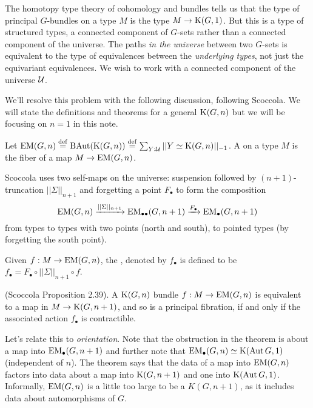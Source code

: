 The homotopy type theory of cohomology and bundles tells us that the type of principal \( G \)-bundles on a type \( M \) is the type \( M\to\mathrm{K}(G,1) \). But this is a type of structured types, a connected component of \( G \)-sets rather than a connected component of the universe. The paths \emph{in the universe} between two \( G \)-sets is equivalent to the type of equivalences between the \emph{underlying types}, not just the equivariant equivalences. We wish to work with a connected component of the universe \( \mathcal{U} \).

We'll resolve this problem with the following discussion, following Scoccola\cite{sco}. We will state the definitions and theorems for a general \( \mathrm{K}(G,n) \) but we will be focusing on \( n=1 \) in this note.

\begin{mydef}
Let \( \mathrm{EM}(G,n)\stackrel{\mathrm{def}}{=} \operatorname{BAut}(\mathrm{K}(G,n))\stackrel{\mathrm{def}}{=} \sum_{Y:\mathcal{U}}||Y\simeq \mathrm{K}(G,n)||_{-1}\). A  on a type \( M \) is the fiber of a map \( M\to\mathrm{EM}(G,n) \).
\end{mydef}

Scoccola uses two self-maps on the universe: suspension followed by \( (n+1) \)-truncation \( ||\Sigma||_{n+1} \) and forgetting a point \( F_\bullet \) to form the composition 
\[ 
\mathrm{EM}(G,n)\xrightarrow[]{||\Sigma||_{n+1}} \mathrm{EM}_{\bullet\bullet}(G,n+1)\xrightarrow[]{F_\bullet}\mathrm{EM_{\bullet}}(G,n+1)
\]
from types to types with two points (north and south), to pointed types (by forgetting the south point).

\begin{mydef}
Given \( f:M\to\mathrm{EM}(G,n) \), the , denoted by \( f_\bullet \) is defined to be \( f_\bullet=F_\bullet\circ||\Sigma||_{n+1}\circ f \).
\end{mydef}

\begin{mythm}
(Scoccola\cite{sco} Proposition 2.39). A \( \mathrm{K}(G,n) \) bundle \( f:M\to\mathrm{EM}(G,n) \) is equivalent to a map in \( M\to\mathrm{K}(G,n+1) \), and so is a principal fibration, if and only if the associated action \( f_\bullet \) is contractible.
\end{mythm}

Let's relate this to \emph{orientation}. Note that the obstruction in the theorem is about a map into \( \mathrm{EM_{\bullet}}(G,n+1) \) and further note that \( \mathrm{EM_{\bullet}}(G,n)\simeq \mathrm{K}(\operatorname{Aut} G,1) \) (independent of \( n \)). The theorem says that the data of a map into \( \mathrm{EM}(G,n) \) factors into data about a map into \( \mathrm{K}(G,n+1) \) and one into \( \mathrm{K}(\operatorname{Aut} G,1) \). Informally, \( \mathrm{EM}(G,n) \) is a little too large to be a \( K(G,n+1) \), as it includes data about automorphisms of \( G \).

